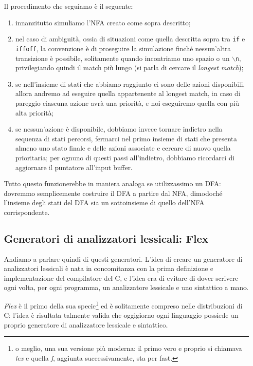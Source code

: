 \documentclass[class=book, crop=false, oneside, 12pt]{standalone}
\begin{document}
Il procedimento che seguiamo è il seguente:
\begin{enumerate}
    \item innanzitutto simuliamo l'NFA creato come sopra descritto;
    \item nel caso di ambiguità, ossia di situazioni come quella descritta sopra tra \texttt{if} e \texttt{iffoff}, la convenzione è di proseguire la simulazione finché nessun’altra transizione è possibile, solitamente quando incontriamo uno spazio o un \texttt{\(\backslash\)n}, privilegiando quindi il match più lungo (si parla di cercare il \emph{longest match});
    \item se nell'insieme di stati che abbiamo raggiunto ci sono delle azioni disponibili, allora andremo ad eseguire quella appartenente al longest match, in caso di pareggio ciascuna azione avrà una priorità, e noi eseguiremo quella con più alta priorità;
    \item se nessun'azione è disponibile, dobbiamo invece tornare indietro nella sequenza di stati percorsi, fermarci nel primo insieme di stati che presenta almeno uno stato finale e delle azioni associate e cercare di nuovo quella prioritaria; per ognuno di questi passi all'indietro, dobbiamo ricordarci di aggiornare il puntatore all'input buffer.
\end{enumerate}

Tutto questo funzionerebbe in maniera analoga se utilizzassimo un DFA: dovremmo semplicemente costruire il DFA a partire dal NFA, dimodoché l'insieme degli stati del DFA sia un sottoinsieme di quello dell'NFA corrispondente.

\subsection{Generatori di analizzatori lessicali: Flex}
Andiamo a parlare quindi di questi generatori. L'idea di creare un generatore di analizzatori lessicali è nata in concomitanza con la prima definizione e implementazione del compilatore del C, e l'idea era di evitare di dover scrivere ogni volta, per ogni programma, un analizzatore lessicale e uno sintattico a mano.

\emph{Flex} è il primo della sua specie\footnote{o meglio, una sua versione più moderna: il primo vero e proprio si chiamava \emph{lex} e quella \emph{f}, aggiunta successivamente, sta per fast.} ed è solitamente compreso nelle distribuzioni di C; l'idea è risultata talmente valida che oggigiorno ogni linguaggio possiede un proprio generatore di analizzatore lessicale e sintattico.
\end{document}
